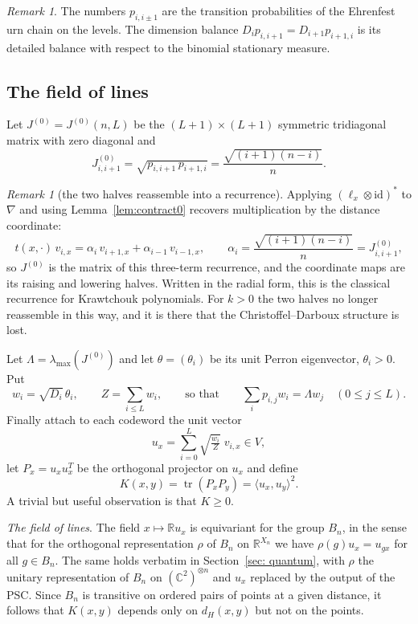 \documentclass[11pt]{amsart}
\theoremstyle{plain}
\theoremstyle{remark}
\newtheorem{remark}[theorem]{Remark}
\newcommand{\R}{\mathbb{R}}
\newcommand{\C}{\mathbb{C}}
\newcommand{\la}{\langle}
\newcommand{\ra}{\rangle}
\newcommand{\tr}{\operatorname{tr}}
\newcommand{\lmax}{\lambda_{\max}}
\begin{document}
\begin{remark}\label{rem:ehrenfest}
The numbers $p_{i,i\pm1}$ are the transition probabilities of the Ehrenfest
urn chain on the levels. The dimension balance
$D_ip_{i,i+1}=D_{i+1}p_{i+1,i}$ is its detailed balance with respect to the
binomial stationary measure. 
\end{remark}

\subsection{The field of lines}

Let $J^{(0)}=J^{(0)}(n,L)$ be the 
$(L+1)\times(L+1)$ symmetric tridiagonal matrix with zero diagonal and
\[
 J^{(0)}_{i,i+1}=\sqrt{p_{i,i+1}\,p_{i+1,i}}=\frac{\sqrt{(i+1)(n-i)}}{n}.
\]

\begin{remark}[the two halves reassemble into a recurrence]\label{rem:recur}
Applying $(\ell_x\otimes\mathrm{id})^{*}$ to $\nabla$ and using
Lemma~\ref{lem:contract0} recovers multiplication by the distance
coordinate:
\[
 t(x,\cdot)\,v_{i,x}
 =\alpha_i\,v_{i+1,x}+\alpha_{i-1}\,v_{i-1,x},
 \qquad
 \alpha_i=\frac{\sqrt{(i+1)(n-i)}}{n}=J^{(0)}_{i,i+1},
\]
so $J^{(0)}$ is the matrix of this three-term recurrence, and the coordinate
maps are its raising and lowering halves. Written in the radial form, this is the classical recurrence for
Krawtchouk polynomials. For $k>0$ the two halves
no longer reassemble in this way, and it is there that the
Christoffel--Darboux structure is lost.
\end{remark}

Let $\Lambda=\lmax(J^{(0)})$ and let $\theta=(\theta_i)$ be its unit Perron eigenvector,
$\theta_i>0$. Put
\begin{equation}\label{eq: Perron}
 w_i=\sqrt{D_i}\,\theta_i,\qquad Z=\sum_{i\le L}w_i,
 \qquad\text{so that}\qquad
 \sum_{i}p_{i,j}w_i=\Lambda w_j \quad (0\le j\le L).
\end{equation}
Finally attach to each codeword the unit vector
\[
 u_x=\sum_{i=0}^{L}\sqrt{\tfrac{w_i}{Z}}\;v_{i,x}\in V,
 \]
let $P_x=u_xu_x^{T}$ be the orthogonal projector on $u_x$ and define
  \[
 K(x,y)=\tr(P_xP_y)=\la u_x,u_y\ra^{2}.
\]
A trivial but useful observation is that $K\ge 0$. 

{\em The field of lines}. The field $x\mapsto\R u_x$ is equivariant for the group $B_n$, in the sense that for the orthogonal representation $\rho$ of $B_n$ on $\R^{X_n}$ we have $\rho(g)u_x=u_{gx}$ for all $g\in B_n$. The same holds verbatim in Section~\ref{sec: quantum}, with 
$\rho$ the unitary representation of $B_n$ on $(\C^2)^{\otimes n}$ and $u_x$ replaced by the output of the PSC. Since
$B_n$ is transitive on ordered pairs of points at a given distance, it follows
that $K(x,y)$ depends only on $d_H(x,y)$ but not on the points.
\end{document}
